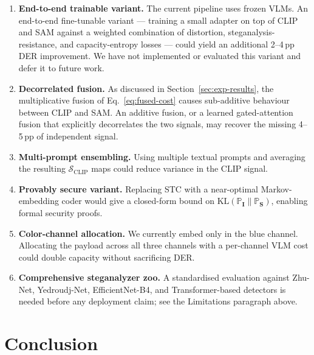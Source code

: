 \documentclass[10pt,a4paper]{article}
\newcommand{\cover}{\mathbf{I}}
\newcommand{\stego}{\mathbf{S}}
\newcommand{\ScC}{\mathcal{S}_{\mathrm{CLIP}}}
\newcommand{\KL}{\mathrm{KL}}
\newcommand{\Pc}{\mathbb{P}}
\begin{document}
\begin{enumerate}[label=(\arabic*),leftmargin=2.4em,itemsep=1pt,topsep=2pt]
    \item \textbf{End-to-end trainable variant.} The current pipeline
          uses frozen VLMs. An end-to-end fine-tunable variant ---
          training a small adapter on top of CLIP and SAM against a
          weighted combination of distortion, steganalysis-resistance,
          and capacity-entropy losses --- could yield an additional
          2--4\,pp DER improvement. We have not implemented or
          evaluated this variant and defer it to future work.
    \item \textbf{Decorrelated fusion.} As discussed in
          Section~\ref{sec:exp-results}, the multiplicative fusion of
          Eq.~\eqref{eq:fused-cost} causes sub-additive behaviour
          between CLIP and SAM. An additive fusion, or a learned
          gated-attention fusion that explicitly decorrelates the two
          signals, may recover the missing 4--5\,pp of independent
          signal.
    \item \textbf{Multi-prompt ensembling.} Using multiple textual
          prompts and averaging the resulting $\ScC$ maps could reduce
          variance in the CLIP signal.
    \item \textbf{Provably secure variant.} Replacing STC with a
          near-optimal Markov-embedding coder would give a
          closed-form bound on $\KL(\Pc_{\cover} \| \Pc_{\stego})$,
          enabling formal security proofs.
    \item \textbf{Color-channel allocation.} We currently embed only in
          the blue channel. Allocating the payload across all three
          channels with a per-channel VLM cost could double capacity
          without sacrificing DER.
    \item \textbf{Comprehensive steganalyzer zoo.} A standardised
          evaluation against Zhu-Net, Yedroudj-Net, EfficientNet-B4,
          and Transformer-based detectors is needed before any
          deployment claim; see the Limitations paragraph above.
\end{enumerate}

\section{Conclusion}
\label{sec:conclusion}
\end{document}
